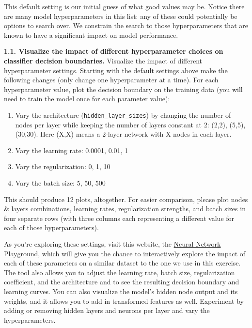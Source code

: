 \documentclass[
  letterpaper,
  DIV=11,
  numbers=noendperiod]{scrartcl}
\providecommand{\tightlist}{%
  \setlength{\itemsep}{0pt}\setlength{\parskip}{0pt}}\usepackage{longtable,booktabs,array}
\begin{document}
This default setting is our initial guess of what good values may be.
Notice there are many model hyperparameters in this list: any of these
could potentially be options to search over. We constrain the search to
those hyperparameters that are known to have a significant impact on
model performance.

\textbf{1.1. Visualize the impact of different hyperparameter choices on
classifier decision boundaries.} Visualize the impact of different
hyperparameter settings. Starting with the default settings above make
the following changes (only change one hyperparameter at a time). For
each hyperparameter value, plot the decision boundary on the training
data (you will need to train the model once for each parameter value):

\begin{enumerate}
\def\labelenumi{\arabic{enumi}.}
\tightlist
\item
  Vary the architecture (\texttt{hidden\_layer\_sizes}) by changing the
  number of nodes per layer while keeping the number of layers constant
  at 2: (2,2), (5,5), (30,30). Here (X,X) means a 2-layer network with X
  nodes in each layer.
\item
  Vary the learning rate: 0.0001, 0.01, 1
\item
  Vary the regularization: 0, 1, 10
\item
  Vary the batch size: 5, 50, 500
\end{enumerate}

This should produce 12 plots, altogether. For easier comparison, please
plot nodes \& layers combinations, learning rates, regularization
strengths, and batch sizes in four separate rows (with three columns
each representing a different value for each of those hyperparameters).

As you're exploring these settings, visit this website, the
\href{https://playground.tensorflow.org/\#activation=relu&batchSize=10&dataset=xor&regDataset=reg-plane&learningRate=0.03&regularizationRate=0&noise=20&networkShape=2,1&seed=0.89022&showTestData=false&discretize=false&percTrainData=50&x=true&y=true&xTimesY=false&xSquared=false&ySquared=false&cosX=false&sinX=false&cosY=false&sinY=false&collectStats=false&problem=classification&initZero=false&hideText=false&showTestData_hide=false}{Neural
Network Playground}, which will give you the chance to interactively
explore the impact of each of these parameters on a similar dataset to
the one we use in this exercise. The tool also allows you to adjust the
learning rate, batch size, regularization coefficient, and the
architecture and to see the resulting decision boundary and learning
curves. You can also visualize the model's hidden node output and its
weights, and it allows you to add in transformed features as well.
Experiment by adding or removing hidden layers and neurons per layer and
vary the hyperparameters.
\end{document}
